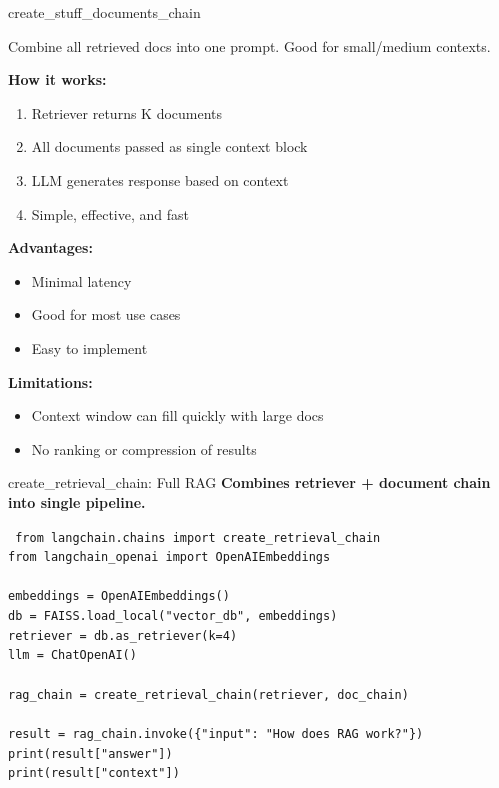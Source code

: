 \documentclass[aspectratio=169,11pt]{beamer}
\begin{document}
\begin{frame}{create\_stuff\_documents\_chain}
  \begin{conceptbox}
    Combine all retrieved docs into one prompt. Good for small/medium contexts.
  \end{conceptbox}

  \textbf{How it works:}
  \begin{enumerate}
    \setlength{\itemsep}{0pt}
    \item Retriever returns K documents
    \item All documents passed as single context block
    \item LLM generates response based on context
    \item Simple, effective, and fast
  \end{enumerate}

  \textbf{Advantages:}
  \begin{itemize}
    \setlength{\itemsep}{1pt}
    \item Minimal latency
    \item Good for most use cases
    \item Easy to implement
  \end{itemize}

  \textbf{Limitations:}
  \begin{itemize}
    \setlength{\itemsep}{1pt}
    \item Context window can fill quickly with large docs
    \item No ranking or compression of results
  \end{itemize}
\end{frame}

\begin{frame}[fragile]{create\_retrieval\_chain: Full RAG}
  \textbf{Combines retriever + document chain into single pipeline.}

  \fontsize{7}{8}\selectfont
  \texttt{
  from langchain.chains import create\_retrieval\_chain \\
  from langchain\_openai import OpenAIEmbeddings \\
  \\
  embeddings = OpenAIEmbeddings() \\
  db = FAISS.load\_local("vector\_db", embeddings) \\
  retriever = db.as\_retriever(k=4) \\
  llm = ChatOpenAI() \\
  \\
  rag\_chain = create\_retrieval\_chain(retriever, doc\_chain) \\
  \\
  result = rag\_chain.invoke(\{"input": "How does RAG work?"\}) \\
  print(result["answer"]) \\
  print(result["context"])
  }
  \normalsize
\end{frame}
\end{document}
